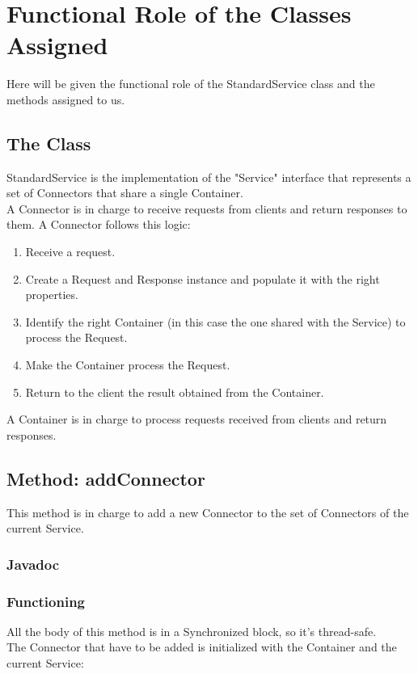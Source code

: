 \documentclass[../../codeInspection.tex]{subfiles}
\begin{document}
	\chapter{Functional Role of the Classes Assigned}

	Here will be given the functional role of the StandardService class and the methods assigned to us.

	\section{The Class}
		StandardService is the implementation of the "Service" interface that represents a set of Connectors that share a single Container.\\
		A Connector is in charge to receive requests from clients and return responses to them.
		A Connector follows this logic:
		\begin{enumerate}
				\item Receive a request.
				\item Create a Request and Response instance and populate it with the right properties.
				\item Identify the right Container (in this case the one shared with the Service) to process the Request.
				\item Make the Container process the Request.
				\item Return to the client the result obtained from the Container.
		\end{enumerate}

		A Container is in charge to process requests received from clients and return responses.

	\section{Method: addConnector}

		This method is in charge to add a new Connector to the set of Connectors of the current Service.

		\subsection{Javadoc}
			

		\subsection{Functioning}
			All the body of this method is in a Synchronized block, so it's thread-safe.\\
			The Connector that have to be added is initialized with the Container and the current Service:
			
\end{document}
